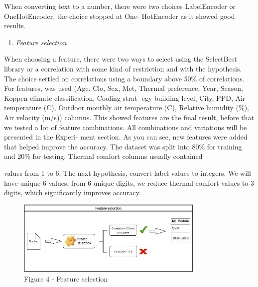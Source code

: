 \begin{multicols}{2}
When converting text to a number, there were two choices LabelEncoder or
OneHotEncoder, the choice stopped at One- HotEncoder as it showed good
results.

\begin{enumerate}
\def\labelenumi{\Alph{enumi}.}
\setcounter{enumi}{3}
\item
  \emph{Feature selection}
\end{enumerate}

When choosing a feature, there were two ways to select using the
SelectBest library or a correlation with some kind of restriction and
with the hypothesis. The choice settled on correlations using a boundary
above 50\% of correlations. For features, was used (Age, Clo, Sex, Met,
Thermal preference, Year, Season, Koppen climate classification, Cooling
strat- egy building level, City, PPD, Air temperature (C), Outdoor
monthly air temperature (C), Relative humidity (\%), Air velocity (m/s))
columns. This showed features are the final result, before that we
tested a lot of feature combinations. All combinations and variations
will be presented in the Experi- ment section. As you can see, new
features were added that helped improve the accuracy. The dataset was
split into 80\% for training and 20\% for testing. Thermal comfort
columns usually contained

values from 1 to 6. The next hypothesis, convert label values to
integers. We will have unique 6 values, from 6 unique digits, we reduce
thermal comfort values to 3 digits, which significantly improves
accuracy.
\end{multicols}

\begin{figure}[H]
	\centering
	\includegraphics[width=0.8\textwidth]{media/ict/image20}
	\caption*{Figure 4 - Feature selection}
\end{figure}

